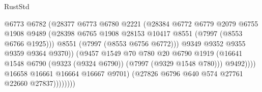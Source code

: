 \begin{lexlean}{RustStd}
\begin{coremodule}
                                              @6773
                                              @6782
                                              (@28377
                                                @6773
                                                @6780
                                                @2221
                                                (@28384
                                                  @6772
                                                  @6779
                                                  @2079
                                                  @6755
                                                  @1908
                                                  @9489
                                                  (@28398
                                                    @6765
                                                    @1908
                                                    @28153
                                                    @10417
                                                    @8551
                                                    (@7997 (@8553 @6766 @1925)))
                                                  @8551
                                                  (@7997 (@8553 @6756 @6772)))
                                                @9349
                                                @9352
                                                @9355
                                                @9359
                                                @9364
                                                @9370))
                                            (@9457
                                              @1549
                                              @70
                                              @780
                                              @20
                                              @6790
                                              @1919
                                              (@16641
                                                @1548
                                                @6790
                                                (@9323 (@9324 @6790))
                                                (@7997 (@9329 @1548 @780)))
                                              @9492))))
                                      @16658
                                      @16661
                                      @16664
                                      @16667
                                      @9701)
                                    (@27826 @6796 @640 @574 @27761 @22660 @27837))))))))

\end{coremodule}
\end{lexlean}
